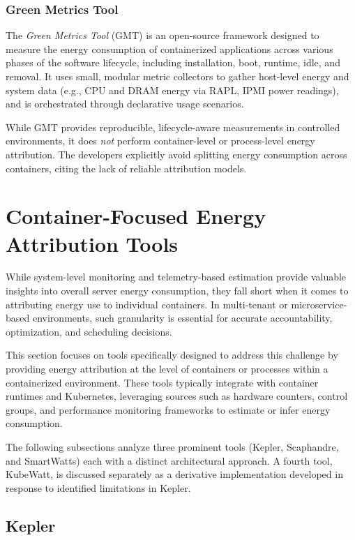 \subsubsection{Green Metrics Tool}

The \textit{Green Metrics Tool} (GMT)\parencite{greencodingdocs} is an open-source framework designed to measure the energy consumption of containerized applications across various phases of the software lifecycle, including installation, boot, runtime, idle, and removal. It uses small, modular metric collectors to gather host-level energy and system data (e.g., CPU and DRAM energy via RAPL, IPMI power readings), and is orchestrated through declarative usage scenarios.

While GMT provides reproducible, lifecycle-aware measurements in controlled environments, it does \textit{not} perform container-level or process-level energy attribution. The developers explicitly avoid splitting energy consumption across containers, citing the lack of reliable attribution models.

\section{Container-Focused Energy Attribution Tools}
\label{sec:container-tools}

While system-level monitoring and telemetry-based estimation provide valuable insights into overall server energy consumption, they fall short when it comes to attributing energy use to individual containers. In multi-tenant or microservice-based environments, such granularity is essential for accurate accountability, optimization, and scheduling decisions. 

This section focuses on tools specifically designed to address this challenge by providing energy attribution at the level of containers or processes within a containerized environment. These tools typically integrate with container runtimes and Kubernetes, leveraging sources such as hardware counters, control groups, and performance monitoring frameworks to estimate or infer energy consumption.

The following subsections analyze three prominent tools (Kepler, Scaphandre, and SmartWatts) each with a distinct architectural approach. A fourth tool, KubeWatt, is discussed separately as a derivative implementation developed in response to identified limitations in Kepler.

\subsection{Kepler}
\label{sec:kepler}

